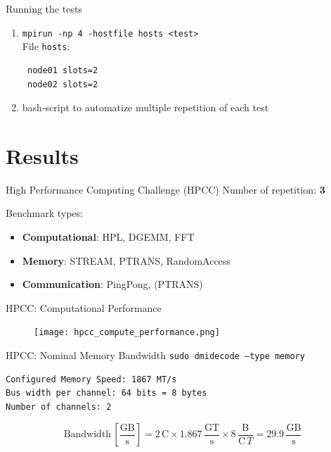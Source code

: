 \documentclass[10pt]{beamer}
\begin{document}
\begin{frame}[fragile]{Running the tests}
  \begin{enumerate}
    \item \texttt{mpirun -np 4 -hostfile hosts <test>}\vspace{0.5cm}
 \\File \texttt{hosts}:
 \begin{verbatim}
 node01 slots=2
 node02 slots=2 
 \end{verbatim}
    \item bash-script to automatize multiple repetition of each test
  \end{enumerate}
 
\end{frame}

\section{Results}

\begin{frame}{High Performance Computing Challenge (HPCC)}
  Number of repetition: \textbf{3}

  Benchmark types:

\begin{itemize}

  \item \textbf{Computational}: HPL, DGEMM, FFT    
  \item \textbf{Memory}:   STREAM, PTRANS, RandomAccess
  \item \textbf{Communication}: PingPong, (PTRANS)

\end{itemize}

\end{frame}

\begin{frame}{HPCC: Computational Performance}
\begin{figure}
  \centering
  \texttt{[image: hpcc\_compute\_performance.png]}
\end{figure}

\end{frame}

\begin{frame}[fragile]{HPCC: Nominal Memory Bandwidth}
\texttt{sudo dmidecode --type memory}  
\begin{verbatim}
Configured Memory Speed: 1867 MT/s
Bus width per channel: 64 bits = 8 bytes
Number of channels: 2
\end{verbatim}
$$
\text{Bandwidth}\, \left[\frac{\text{GB}}{\text{s}}\right] = \text{2}\, \text{C} \times 1.867\, \frac{\text{GT}}{\text{s}} \times 8\, \frac{\text{B}}{\text{C}\,{T}} = 29.9\,\frac{\text{GB}}{\text{s}}
$$

\end{frame}
\end{document}
